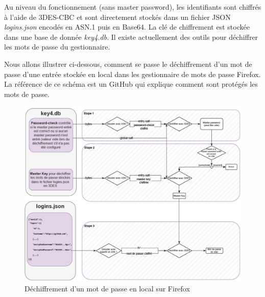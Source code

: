 Au niveau du fonctionnement\cite{firefoxEncr} (sans master password), les identifiants sont chiffrés à l'aide de 3DES-CBC et sont directement stockés dans un fichier JSON \textit{logins.json} encodés en ASN.1 puis en Base64. La clé de chiffrement est stockée dans une base de donnée \textit{key4.db}. Il existe actuellement des outils pour déchiffrer les mots de passe du gestionnaire.

Nous allons illustrer ci-dessous, comment se passe le déchiffrement d'un mot de passe d'une entrée stockée en local dans les gestionnaire de mots de passe Firefox. La référence de ce schéma est un GitHub\cite{firepwd} qui explique comment sont protégés les mots de passe.

\begin{figure}[H]
	\includegraphics[width=15.5cm]{images/firefox_local.png}
	\centering
	\caption{Déchiffrement d'un mot de passe en local sur Firefox}
\end{figure}

